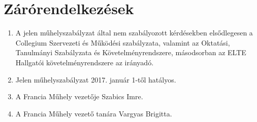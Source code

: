 \documentclass{rulebook}
\begin{document}
\section{Zárórendelkezések}

\begin{enumerate}
	\item A jelen műhelyszabályzat által nem szabályozott kérdésekben elsődlegesen a Collegium Szervezeti és Működési szabályzata, valamint az Oktatási, Tanulmányi Szabályzata és Követelményrendszere, másodsorban az ELTE Hallgatói követelményrendszere az irányadó.
	\item Jelen műhelyszabályzat 2017. január 1-től hatályos.
	\item A Francia Műhely vezetője Szabics Imre.
	\item A Francia Műhely vezető tanára Vargyas Brigitta.
\end{enumerate}
\end{document}
